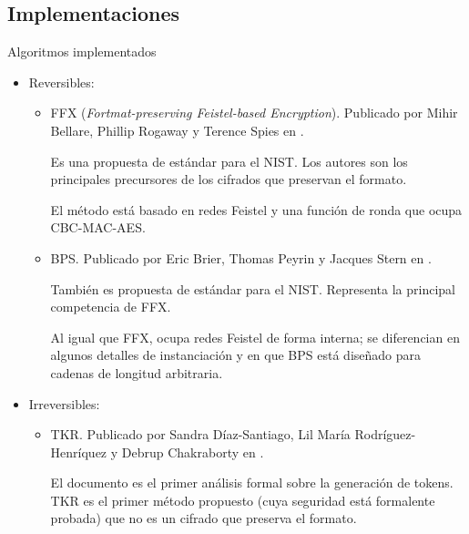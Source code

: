 %
%
%

\subsection{Implementaciones}

\begin{frame}{Algoritmos implementados}

  \begin{itemize}
    \item<1-> Reversibles:
      \begin{itemize}

        \item<2-> FFX (\textit{Fortmat-preserving Feistel-based Encryption}).
          Publicado por Mihir Bellare, Phillip Rogaway y Terence Spies en
          \cite{ffx_1}.

          {
            Es una propuesta de estándar para el NIST. Los autores son los
            principales precursores de los cifrados que preservan el
            formato.

            El método está basado en redes Feistel y una función de ronda
            que ocupa CBC-MAC-AES.
          }

        \item<3-> BPS. Publicado por Eric Brier, Thomas Peyrin y Jacques
          Stern en \cite{bps}.

          {
            También es propuesta de estándar para el NIST. Representa la
            principal competencia de FFX.

            Al igual que FFX, ocupa redes Feistel de forma interna; se
            diferencian en algunos detalles de instanciación y en que
            BPS está diseñado para cadenas de longitud arbitraria.
          }

      \end{itemize}
    \item<4-> Irreversibles:
      \begin{itemize}

        \item<5-> TKR. Publicado por Sandra Díaz-Santiago, Lil María
          Rodríguez-Henríquez y Debrup Chakraborty en \cite{doc_sandra}.

          {
            El documento es el primer análisis formal sobre la generación de
            tokens. TKR es el primer método propuesto (cuya seguridad está
            formalente probada) que no es un cifrado que preserva el formato.
          }


\end{itemize}
\end{itemize}
\end{frame}
